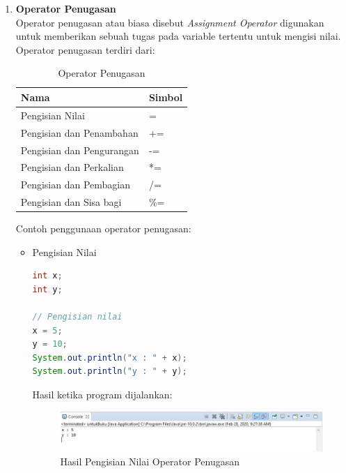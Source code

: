 \begin{enumerate}
    \item \textbf{Operator Penugasan}\\
    Operator penugasan atau biasa disebut \textit{Assignment Operator} digunakan untuk memberikan sebuah tugas pada variable tertentu untuk mengisi nilai. Operator penugasan terdiri dari:
    \begin{table}[h!]
        \begin{center}
        \begin{tabular}{|l|l|}
            \hline
            \rowcolor[HTML]{9AFF99} 
            \textbf{Nama}             & \textbf{Simbol} \\ \hline
            Pengisian Nilai           & =               \\ \hline
            Pengisian dan Penambahan  & +=              \\ \hline
            Pengisian dan Pengurangan & -=              \\ \hline
            Pengisian dan Perkalian   & *=              \\ \hline
            Pengisian dan Pembagian   & /=              \\ \hline
            Pengisian dan Sisa bagi   & \%=             \\ \hline
            \end{tabular}
            \caption{Operator Penugasan}
        \end{center}
    \end{table}
    Contoh penggunaan operator penugasan:
    \begin{itemize}
        \item Pengisian Nilai
        \begin{lstlisting}[language=Java]
int x;
int y;

// Pengisian nilai
x = 5;
y = 10;
System.out.println("x : " + x);
System.out.println("y : " + y);
        \end{lstlisting}
        Hasil ketika program dijalankan:
        \begin{figure}[htbp!]
            \centering
            \includegraphics[scale=0.6]{pictures/Pengisian_Nilai_Operator_Penugasan.jpg}
            \caption{Hasil Pengisian Nilai Operator Penugasan}
            \label{}
        \end{figure}


\end{itemize}
\end{enumerate}

